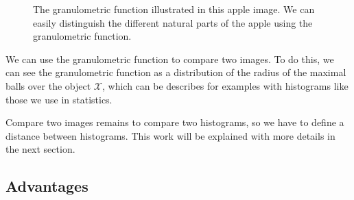 \begin{figure}[!ht]
    \centering
    \qquad\qquad\qquad
    \caption{The granulometric function illustrated in this apple image. We can easily distinguish the different natural parts of the apple using the granulometric function.}
    \label{apple-granulo}
\end{figure}

We can use the granulometric function to compare two images. To do this, we can see the granulometric function as a distribution of the radius of the maximal balls over the object $\mathcal{X}$, which can be describes for examples with histograms like those we use in statistics.


Compare two images remains to compare two histograms, so we have to define a distance between histograms. This work will be explained with more details in the next section.

\subsection{Advantages}

